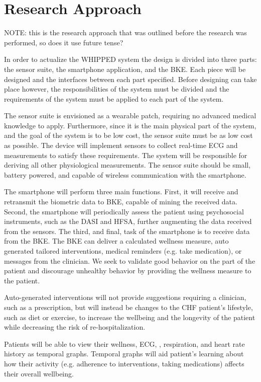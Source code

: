 \section{Research Approach}

NOTE: this is the research approach that was outlined before the research was performed, so does it use future tense?

In order to actualize the WHIPPED system the design is divided into three parts: the sensor suite, the smartphone application, and the BKE. Each piece will be designed and the interfaces between each part specified. Before designing can take place however, the responsibilities of the system must be divided and the requirements of the system must be applied to each part of the system.

The sensor suite is envisioned as a wearable patch, requiring no advanced medical knowledge to apply. Furthermore, since it is the main physical part of the system, and the goal of the system is to be low cost, the sensor suite must be as low cost as possible. The device will implement sensors to collect real-time ECG and  measurements to satisfy these requirements. The system will be responsible for deriving all other physiological measurements. The sensor suite should be small, battery powered, and capable of wireless communication with the smartphone. 

The smartphone will perform three main functions. First, it will receive and retransmit the biometric data to BKE, capable of mining the received data. Second, the smartphone will periodically assess the patient using psychosocial instruments, such as the DASI and HFSA, further augmenting the data received from the sensors. The third, and final, task of the smartphone is to receive data from the BKE. The BKE can deliver a calculated wellness measure, auto generated tailored interventions, medical reminders (e.g. take medication), or messages from the clinician. We seek to validate good behavior on the part of the patient and discourage unhealthy behavior by providing the wellness measure to the patient. 

Auto-generated interventions will not provide suggestions requiring a clinician, such as a prescription, but will instead be changes to the CHF patient's lifestyle, such as diet or exercise, to increase the wellbeing and the longevity of the patient while decreasing the risk of re-hospitalization. 

Patients will be able to view their wellness, ECG, , respiration, and heart rate history as temporal graphs. Temporal graphs will aid patient's learning about how their activity (e.g. adherence to interventions, taking medications) affects their overall wellbeing.

